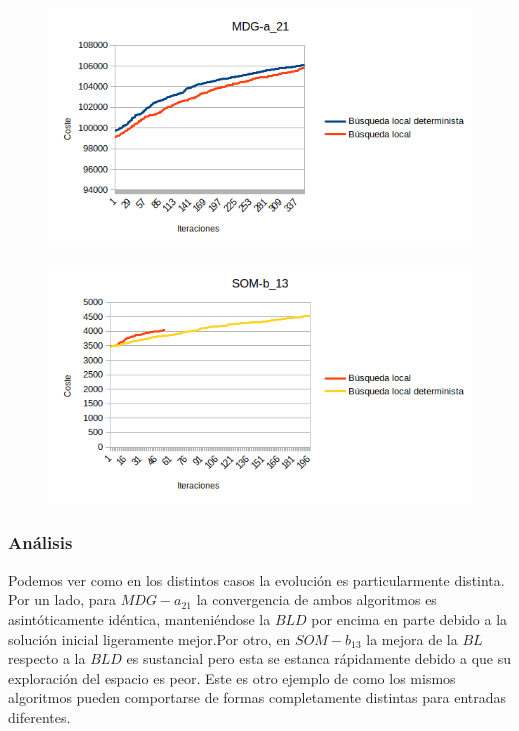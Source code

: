 \documentclass[11pt,a4paper]{article}
\begin{document}
	\begin{figure}[H] 
		\centering
		\includegraphics[scale=1]{../output/evolution/MDG-a_21} 
	\end{figure}
	
	\begin{figure}[H] 
		\centering
		\includegraphics[scale=1]{../output/evolution/SOM-b_13} 
	\end{figure}

	\subsubsection{ Análisis }
	
	Podemos ver como en los distintos casos la evolución es particularmente distinta. Por un lado, para $MDG-a_21$ la convergencia de ambos algoritmos es asintóticamente idéntica, manteniéndose la $BLD$ por encima en parte debido a la solución inicial ligeramente mejor.Por otro, en $SOM-b_13$ la mejora de la $BL$ respecto a la $BLD$ es sustancial pero esta se estanca rápidamente debido a que su exploración del espacio es peor. Este es otro ejemplo de como los mismos algoritmos pueden comportarse de formas completamente distintas para entradas diferentes.
\end{document}
